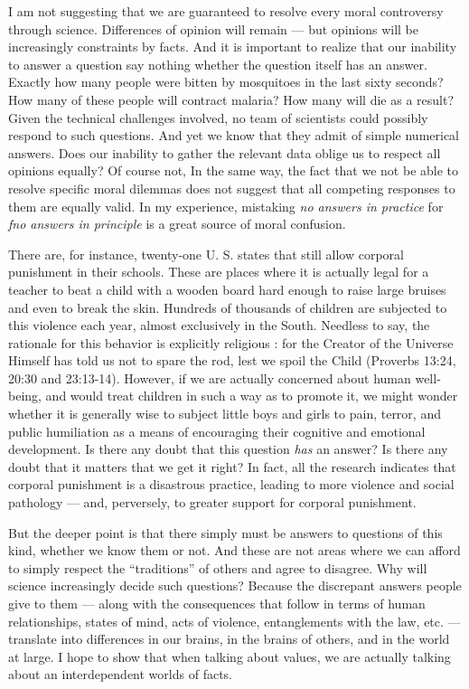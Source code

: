 \documentclass[a4paper,14pt]{extarticle}
\begin{document}
I am not suggesting that we are guaranteed to resolve every moral controversy through science.
Differences of opinion will remain --- but opinions will be increasingly constraints by facts.
And it is important to realize that our inability to answer a question say nothing whether the question itself has an answer.
Exactly how many people were bitten by mosquitoes in the last sixty seconds?
How many of these people will contract malaria?
How many will die as a result?
Given the technical challenges involved, no team of scientists could possibly respond to such questions.
And yet we know that they admit of simple numerical answers.
Does our inability to gather the relevant data oblige us to respect all opinions equally?
Of course not,
In the same way, the fact that we not be able to resolve specific moral dilemmas does not suggest that all competing responses to them are equally valid.
In my experience, mistaking \textit{no answers in practice} for \textit{fno answers in principle} is a great source of moral confusion.

There are, for instance, twenty-one U. S. states that still allow corporal punishment in their schools.
These are places where it is actually legal for a teacher to beat a child with a wooden board hard enough to raise large bruises and even to break the skin.
Hundreds of thousands of children are subjected to this violence each year, almost exclusively in the South.
Needless to say, the rationale for this behavior is explicitly religious :
for the Creator of the Universe Himself has told us not to spare the rod, lest we spoil the Child (Proverbs 13:24, 20:30 and 23:13-14).
However, if we are actually concerned about human well-being, and would treat children in such a way as to promote it, we might wonder whether it is generally wise to subject little boys and girls to pain, terror, and public humiliation as a means of encouraging their cognitive and emotional development.
Is there any doubt that this question \textit{has} an answer?
Is there any doubt that it matters that we get it right?
In fact, all the research indicates that corporal punishment is a disastrous practice, leading to more violence and social pathology --- and, perversely, to greater support for corporal punishment.

But the deeper point is that there simply must be answers to questions of this kind, whether we know them or not.
And these are not areas where we can afford to simply respect the ``traditions'' of others and agree to disagree.
Why will science increasingly decide such questions?
Because the discrepant answers people give to them --- along with the consequences that follow in terms of human relationships, states of mind, acts of violence, entanglements with the law, etc. --- translate into differences in our brains, in the brains of others, and in the world at large.
I hope to show that when talking about values, we are actually talking about an interdependent worlds of facts.
\end{document}
